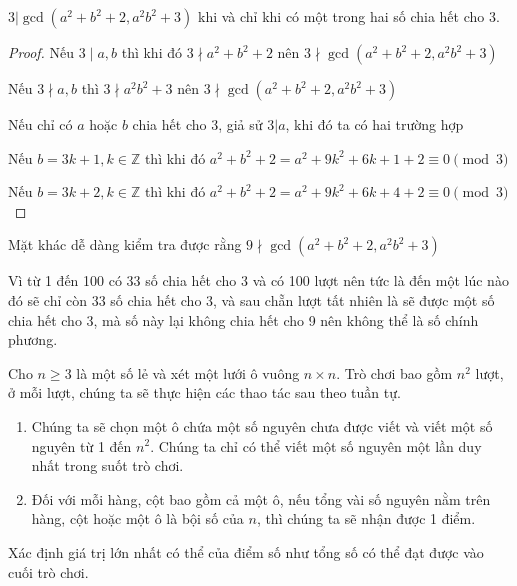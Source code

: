 \documentclass[11pt]{scrartcl}
\begin{document}
\begin{itemize}[label=, leftmargin=0em, itemsep=0.5em]
    
\begin{sol}

     $3 | \gcd(a^2 + b^2 + 2,a^2b^2 + 3)$ khi và chỉ khi có một trong hai số chia hết cho $3$.
    \begin{proof}
        Nếu $3 \mid a,b$ thì khi đó $3\nmid a^2 + b^2 + 2$ nên $3 \nmid \gcd(a^2 + b^2 + 2, a^2b^2 + 3)$
  
  
    Nếu $3 \nmid a,b$ thì $3\nmid a^2b^2 +3$ nên $3 \nmid \gcd(a^2 + b^2 + 2, a^2b^2 + 3)$
  
  
    Nếu chỉ có $a$ hoặc $b$ chia hết cho $3$, giả sử $3 | a$, khi đó ta có hai trường hợp
  
  
    Nếu $b = 3k + 1, k \in \mathbb{Z}$ thì khi đó $a^2 + b^2 + 2 = a^2 + 9k^2 + 6k + 1 + 2 \equiv 0 \pmod{3}$
  
  
    Nếu $b = 3k + 2, k \in \mathbb{Z}$ thì khi đó $a^2 + b^2 + 2 = a^2 +9k^2 + 6k + 4 + 2 \equiv 0 \pmod{3}$
    \end{proof}
  
    Mặt khác dễ dàng kiểm tra được rằng $ 9 \nmid \gcd(a^2 + b^2 + 2, a^2b^2 + 3)$
  
  
    Vì từ 1 đến 100 có $33$ số chia hết cho 3 và có 100 lượt nên tức là đến một lúc nào đó sẽ chỉ còn $33$ số chia hết cho 3, và sau chẵn lượt tất nhiên là sẽ được một số chia hết cho 3, mà số này lại không chia hết cho 9 nên không thể là số chính phương.
  \end{sol}

    \begin{bt}
        Cho $n \geq 3$ là một số lẻ và xét một lưới ô vuông $n\times n$. Trò chơi bao gồm $n^2$ lượt, ở mỗi lượt, chúng ta sẽ thực hiện các thao tác sau theo tuần tự.
        \begin{enumerate}
            \item Chúng ta sẽ chọn một ô chứa một số nguyên chưa được viết và viết một số nguyên từ 1 đến $n^2$. Chúng ta chỉ có thể viết một số nguyên một lần duy nhất trong suốt trò chơi.
            \item Đối với mỗi hàng, cột bao gồm cả một ô, nếu tổng vài số nguyên  nằm trên hàng, cột hoặc một ô là bội số của $n$, thì chúng ta sẽ nhận được 1 điểm.
        \end{enumerate}
        Xác định giá trị lớn nhất có thể của điểm số như tổng số có thể đạt được vào cuối trò chơi.
    \end{bt}


\end{itemize}
\end{document}
